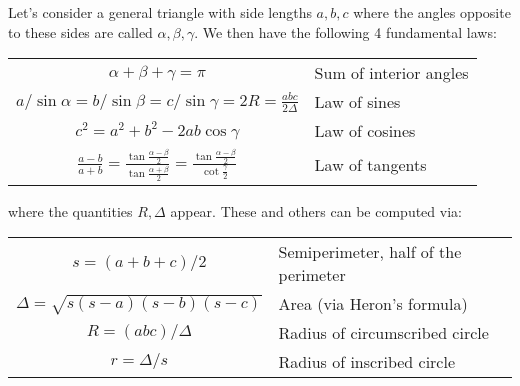 \medskip
Let's consider a general triangle with side lengths $a,b,c$ where the angles opposite to these sides are called $\alpha, \beta, \gamma$. We then have the following 4 fundamental laws:

\medskip
\begin{tabular}{c l}
  $\alpha + \beta + \gamma = \pi$                       & Sum of interior angles \\
  $a / \sin \alpha = b / \sin \beta 
    = c / \sin \gamma 
    = 2R = \frac{abc}{2 \Delta}$                        & Law of sines \\  
  $c^2 = a^2 + b^2 - 2ab \cos \gamma$                   & Law of cosines \\
  $\frac{a-b}{a+b} 
   = \frac{\tan \frac{\alpha-\beta}{2}}{\tan \frac{\alpha+\beta}{2}} 
   = \frac{\tan \frac{\alpha-\beta}{2}}{\cot \frac{\gamma}{2}}$
                                                        & Law of tangents \\
\end{tabular}
\medskip

where the quantities $R, \Delta$ appear. These and others can be computed via:

\medskip
\begin{tabular}{c l}
  $s = (a+b+c)/2$                      & Semiperimeter, half of the perimeter \\
  $\Delta = \sqrt{s(s-a)(s-b)(s-c)}$   & Area (via Heron's formula) \\
  $R = (abc)/ \Delta$                  & Radius of circumscribed circle \\
  $r = \Delta/s$                       & Radius of inscribed circle \\
\end{tabular}
\medskip



\begin{comment}
-rename file to Geo_Elementary

-plot a drawing of a triangle with vertices A,B,C, sides a,b,c and angles alpha, beta, gamma
-give a bunch of formulas that hold for all triangles
-the plot some special triangles (right, isosceles, etc.) and give the formulas specific to them
-mention non-Euclidean trigonometry, espeically spherical...maybe give the formulas for those
triangles, too - or maybe refer to some ressource

-give formulas for volumes of 3D shapes

https://en.wikipedia.org/wiki/Trigonometry

\end{comment}